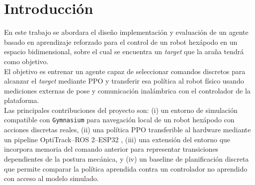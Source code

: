 \documentclass[conference]{IEEEtran}
\begin{document}
\section{Introducción}
En este trabajo se abordara el diseño implementación y evaluación de un agente basado en aprendizaje reforzado para el control de un robot hexápodo en un espacio bidimensional, sobre el cual se encuentra un \textit{target} que la araña tendrá como objetivo.\\
El objetivo es entrenar un agente capaz de seleccionar comandos discretos para alcanzar el \textit{target} mediante PPO y transferir esa política al robot físico usando mediciones externas de pose y comunicación inalámbrica con el controlador de la plataforma.\\
Las principales contribuciones del proyecto son: (i) un entorno de simulación compatible con \texttt{Gymnasium} \cite{gymnasium} para navegación local de un robot hexápodo con acciones discretas reales, (ii) una política PPO transferible al hardware mediante un pipeline OptiTrack--ROS 2--ESP32 \cite{ros2}, (iii) una extensión del entorno que incorpora memoria del comando anterior para representar transiciones dependientes de la postura mecánica, y (iv) un baseline de planificación discreta que permite comparar la política aprendida contra un controlador no aprendido con acceso al modelo simulado.
\end{document}
